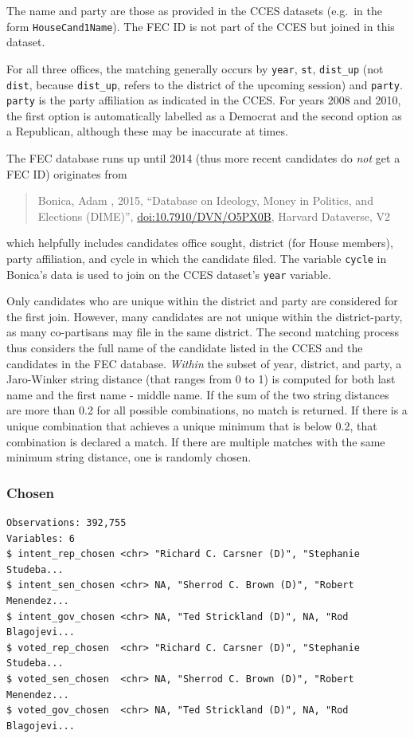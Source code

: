 \documentclass[10pt,article,oneside]{memoir}
\theoremstyle{definition}
\begin{document}
The name and party are those as provided in the CCES datasets (e.g.~in
the form \texttt{HouseCand1Name}). The FEC ID is not part of the CCES
but joined in this dataset.

For all three offices, the matching generally occurs by \texttt{year},
\texttt{st}, \texttt{dist\_up} (not \texttt{dist}, because
\texttt{dist\_up}, refers to the district of the upcoming session) and
\texttt{party}. \texttt{party} is the party affiliation as indicated in
the CCES. For years 2008 and 2010, the first option is automatically
labelled as a Democrat and the second option as a Republican, although
these may be inaccurate at times.

The FEC database runs up until 2014 (thus more recent candidates do
\emph{not} get a FEC ID) originates from

\begin{quote}
Bonica, Adam , 2015, ``Database on Ideology, Money in Politics, and
Elections (DIME)'', \url{doi:10.7910/DVN/O5PX0B}, Harvard Dataverse, V2
\end{quote}

which helpfully includes candidates office sought, district (for House
members), party affiliation, and cycle in which the candidate filed. The
variable \texttt{cycle} in Bonica's data is used to join on the CCES
dataset's \texttt{year} variable.

Only candidates who are unique within the district and party are
considered for the first join. However, many candidates are not unique
within the district-party, as many co-partisans may file in the same
district. The second matching process thus considers the full name of
the candidate listed in the CCES and the candidates in the FEC database.
\emph{Within} the subset of year, district, and party, a Jaro-Winker
string distance (that ranges from 0 to 1) is computed for both last name
and the first name - middle name. If the sum of the two string distances
are more than 0.2 for all possible combinations, no match is returned.
If there is a unique combination that achieves a unique minimum that is
below 0.2, that combination is declared a match. If there are multiple
matches with the same minimum string distance, one is randomly chosen.

\subsubsection{Chosen}\label{chosen}

\begin{verbatim}
Observations: 392,755
Variables: 6
$ intent_rep_chosen <chr> "Richard C. Carsner (D)", "Stephanie Studeba...
$ intent_sen_chosen <chr> NA, "Sherrod C. Brown (D)", "Robert Menendez...
$ intent_gov_chosen <chr> NA, "Ted Strickland (D)", NA, "Rod Blagojevi...
$ voted_rep_chosen  <chr> "Richard C. Carsner (D)", "Stephanie Studeba...
$ voted_sen_chosen  <chr> NA, "Sherrod C. Brown (D)", "Robert Menendez...
$ voted_gov_chosen  <chr> NA, "Ted Strickland (D)", NA, "Rod Blagojevi...
\end{verbatim}
\end{document}

